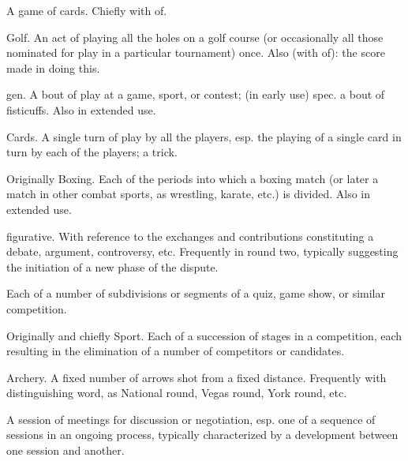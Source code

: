 \begin{compactitem}
			\item[VII.34.a] A game of cards. Chiefly with of.
			\item[VII.34.b] Golf. An act of playing all the holes on a golf course (or occasionally all those nominated for play in a particular tournament) once. Also (with of): the score made in doing this.
			\item[VII.34.c] gen. A bout of play at a game, sport, or contest; (in early use) spec. a bout of fisticuffs. Also in extended use.
			\item[VII.35] Cards. A single turn of play by all the players, esp. the playing of a single card in turn by each of the players; a trick.
			\item[VII.36.a] Originally Boxing. Each of the periods into which a boxing match (or later a match in other combat sports, as wrestling, karate, etc.) is divided. Also in extended use.
			\item[VII.36.b] figurative. With reference to the exchanges and contributions constituting a debate, argument, controversy, etc. Frequently in round two, typically suggesting the initiation of a new phase of the dispute.
			\item[VII.36.c] Each of a number of subdivisions or segments of a quiz, game show, or similar competition.
			\item[VII.37] Originally and chiefly Sport. Each of a succession of stages in a competition, each resulting in the elimination of a number of competitors or candidates.
			\item[VII.38] Archery. A fixed number of arrows shot from a fixed distance. Frequently with distinguishing word, as National round, Vegas round, York round, etc.
			\item[VII.39] A session of meetings for discussion or negotiation, esp. one of a sequence of sessions in an ongoing process, typically characterized by a development between one session and another.
		\end{compactitem}


	
